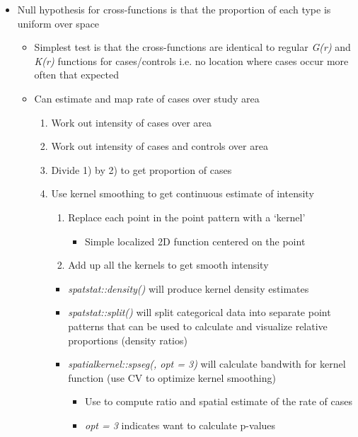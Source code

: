 \documentclass{article}
\begin{document}
\begin{itemize}
\begin{itemize}
    \end{itemize}
    \item Null hypothesis for cross-functions is that the proportion of each type is uniform over space
    \begin{itemize}
        \item Simplest test is that the cross-functions are identical to regular \textit{G(r)} and \textit{K(r)} functions for cases/controls i.e. no location where cases occur more often that expected
        \item Can estimate and map rate of cases over study area
        \begin{enumerate}
            \item Work out intensity of cases over area
            \item Work out intensity of cases and controls over area
            \item Divide 1) by 2) to get proportion of cases
            \item Use kernel smoothing to get continuous estimate of intensity
            \begin{enumerate}
                \item Replace each point in the point pattern with a `kernel'
                \begin{itemize}
                    \item Simple localized 2D function centered on the point
                \end{itemize}
                \item Add up all the kernels to get smooth intensity
            \end{enumerate}
            \begin{itemize}
                \item \textit{spatstat::density()} will produce kernel density estimates
                \item \textit{spatstat::split()} will split categorical data into separate point patterns that can be used to calculate and visualize relative proportions (density ratios)
                \item \textit{spatialkernel::spseg(, opt = 3)} will calculate bandwith for kernel function (use CV to optimize kernel smoothing)
                \begin{itemize}
                    \item Use to compute ratio and spatial estimate of the rate of cases
                    \item \textit{opt = 3} indicates want to calculate p-values

\end{itemize}
\end{itemize}
\end{enumerate}
\end{itemize}
\end{itemize}
\end{document}
